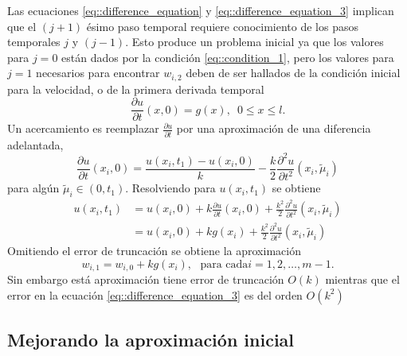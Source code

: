\documentclass[a4paper]{article}
\begin{document}
Las ecuaciones \ref{eq::difference_equation} y \ref{eq::difference_equation_3} implican que el $(j+1)$ ésimo paso temporal requiere conocimiento de los pasos temporales $j$ y $(j-1)$. Esto produce un problema inicial ya que los valores para $j=0$ están dados por la condición \ref{eq::condition_1}, pero los valores para $j=1$ necesarios para encontrar $w_{i,2}$ deben de ser hallados de la condición inicial para la velocidad, o de la primera derivada temporal
\begin{equation}
\frac{\partial u}{\partial t}(x,0)=g(x),\,\,\,0\leq x \leq l.
\end{equation}
Un acercamiento es reemplazar $\frac{\partial u}{\partial t}$ por una aproximación de una diferencia adelantada,
\begin{equation}
\frac{\partial u}{\partial t}(x_i,0)=\frac{u(x_i,t_1)-u(x_i,0)}{k}-\frac{k}{2}\frac{\partial^2 u}{\partial t^2}(x_i,\tilde{\mu}_i)
\end{equation}
para algún $\tilde{\mu}_i \in (0,t_1)$. Resolviendo para $u(x_i,t_1)$ se obtiene
\begin{equation}
\begin{aligned}
u(x_i,t_1)&=u(x_i,0)+k\frac{\partial u}{\partial t}(x_i,0)+\frac{k^2}{2}\frac{\partial^2 u}{\partial t^2}(x_i,\tilde{\mu}_i)\\
&=u(x_i,0)+kg(x_i)+\frac{k^2}{2}\frac{\partial^2 u}{\partial t^2}(x_i,\tilde{\mu}_i)
\end{aligned}
\end{equation} 
Omitiendo el error de truncación se obtiene la aproximación
\begin{equation}
w_{i,1}=w_{i,0}+kg(x_i),\,\,\,\,\text{para cada} i=1,2,\hdots,m-1.
\end{equation}
Sin embargo está aproximación tiene error de truncación $O(k)$ mientras que el error en la ecuación \ref{eq::difference_equation_3} es del orden $O(k^2)$
\subsection{Mejorando la aproximación inicial}
\end{document}
